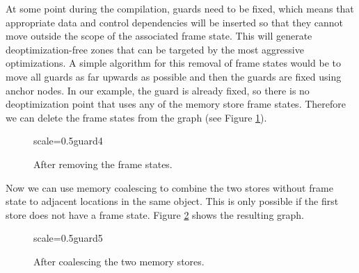 \documentclass[twocolumn]{svjour3}
\begin{document}
At some point during the compilation, guards need to be fixed, which means that appropriate data and control dependencies will be inserted so that they cannot move outside the scope of the associated frame state.
This will generate deoptimization-free zones that can be targeted by the most aggressive optimizations.
A simple algorithm for this removal of frame states would be to move all guards as far upwards as possible and then the guards are fixed using anchor nodes.
In our example, the guard is already fixed, so there is no deoptimization point that uses any of the memory store frame states.
Therefore we can delete the frame states from the graph (see Figure \ref{fig:guard4}).

\begin{figure}[ht]
  \centering
\begin{digraphenv}{scale=0.5}{guard4}
\end{digraphenv}
  \caption{After removing the frame states.}
  \label{fig:guard4}
\end{figure}

Now we can use memory coalescing to combine the two stores without frame state to adjacent locations in the same object.
This is only possible if the first store does not have a frame state.
Figure \ref{fig:guard5} shows the resulting graph.


\begin{figure}[ht]
  \centering
\begin{digraphenv}{scale=0.5}{guard5}
\end{digraphenv}
  \caption{After coalescing the two memory stores.}
  \label{fig:guard5}
\end{figure}
\end{document}
